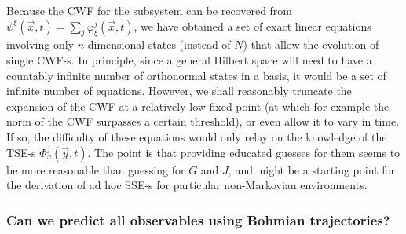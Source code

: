 \documentclass[11pt, a4paper]{article} %
\begin{document}
Because the CWF for the subsystem can be recovered from $\psi^\xi(\vec{x},t)=\sum_j \varphi^j_\xi(\vec{x},t)$, we have obtained a set of exact linear equations involving only $n$ dimensional states (instead of $N$) that allow the evolution of single CWF-s. In principle, since a general Hilbert space will need to have a countably infinite number of orthonormal states in a basis, it would be a set of infinite number of equations. However, we shall reasonably truncate the expansion of the CWF at a relatively low fixed point (at which for example the norm of the CWF surpasses a certain threshold), or even allow it to vary in time. If so, the difficulty of these equations would only relay on the knowledge of the TSE-s $\Phi^j_x(\vec{y},t)$. The point is that providing educated guesses for them seems to be more reasonable than guessing for $G$ and $J$, and might be a starting point for the derivation of ad hoc SSE-s for particular non-Markovian environments.  \vspace{-0.2cm}

 
\subsubsection*{Can we predict all observables using Bohmian trajectories?}
\end{document}
